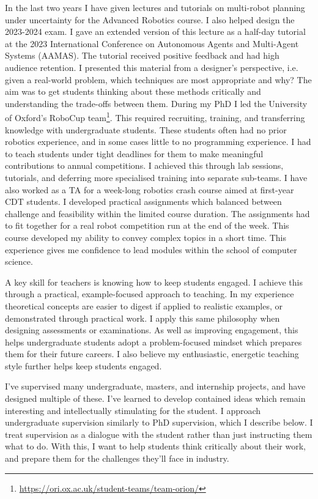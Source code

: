 \documentclass[12pt]{article}
\begin{document}
In the last two years I have given lectures and tutorials on multi-robot planning under uncertainty for the Advanced Robotics course.
%
I also helped design the 2023-2024 exam.
%
I gave an extended version of this lecture as a half-day tutorial at the 2023 International Conference on Autonomous Agents and Multi-Agent Systems (AAMAS).
%
The tutorial received positive feedback and had high audience retention.
%
I presented this material from a designer's perspective, i.e. given a real-world problem, which techniques are most appropriate and why?
%
The aim was to get students thinking about these methods critically and understanding the trade-offs between them.
%
During my PhD I led the University of Oxford's RoboCup team\footnote{\url{https://ori.ox.ac.uk/student-teams/team-orion/}}.
%
This required recruiting, training, and transferring knowledge with undergraduate students.
%
These students often had no prior robotics experience, and in some cases little to no programming experience.
%
I had to teach students under tight deadlines for them to make meaningful contributions to annual competitions. 
%
I achieved this through lab sessions, tutorials, and deferring more specialised training into separate sub-teams.
%
%
I have also worked as a TA for a week-long robotics crash course aimed at first-year CDT students.
%
I developed practical assignments which balanced between challenge and feasibility within the limited course duration.
%
The assignments had to fit together for a real robot competition run at the end of the week.
%
This course developed my ability to convey complex topics in a short time.
%
This experience gives me confidence to lead modules within the school of computer science.

A key skill for teachers is knowing how to keep students engaged.
%
I achieve this through a practical, example-focused approach to teaching.
%
In my experience theoretical concepts are easier to digest if applied to realistic examples, or demonstrated through practical work.
%
I apply this same philosophy when designing assessments or examinations.
%
As well as improving engagement, this helps undergraduate students adopt a problem-focused mindset which prepares them for their future careers.
%
I also believe my enthusiastic, energetic teaching style further helps keep students engaged.

I've supervised many undergraduate, masters, and internship projects, and have designed multiple of these.
%
I've learned to develop contained ideas which remain interesting and intellectually stimulating for the student.
%
I approach undergraduate supervision similarly to PhD supervision, which I describe below.
%
I treat supervision as a dialogue with the student rather than just instructing them what to do.
%
With this, I want to help students think critically about their work, and prepare them for the challenges they'll face in industry.
\end{document}
